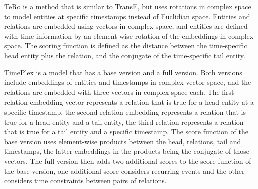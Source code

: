 TeRo is a method that is similar to TransE, but uses rotations in complex space to model entities at specific timestamps instead of Euclidian space. Entities and relations are embedded using vectors in complex space, and entities are defined with time information by an element-wise rotation of the embeddings in complex space. The scoring function is defined as the distance between the time-specific head entity plus the relation, and the conjugate of the time-specific tail entity.

TimePlex is a model that has a base version and a full version. Both versions include embeddings of entities and timestamps in complex vector space, and the relations are embedded with three vectors in complex space each. The first relation embedding vector represents a relation that is true for a head entity at a specific timestamp, the second relation embedding represents a relation that is true for a head entity and a tail entity, the third relation represents a relation that is true for a tail entity and a specific timestamp. The score function of the base version uses element-wise products between the head, relations, tail and timestamps, the latter embeddings in the products being the conjugate of those vectors. The full version then adds two additional scores to the score function of the base version, one additional score considers recurring events and the other considers time constraints between pairs of relations.
